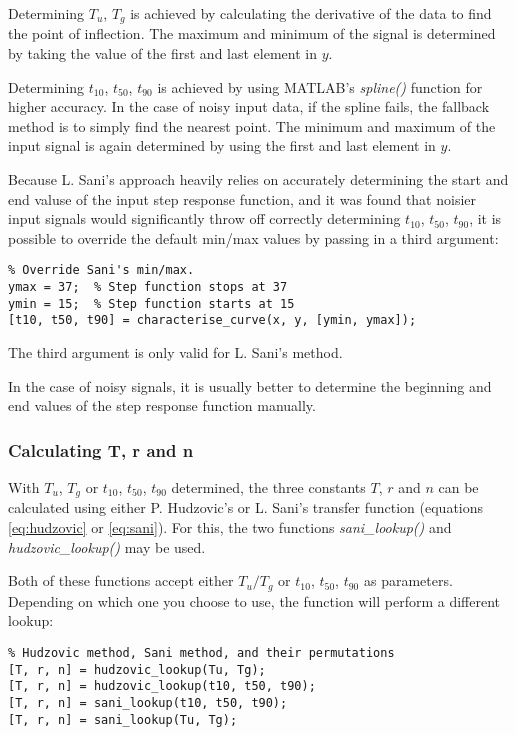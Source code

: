 Determining $T_u$, $T_g$ is achieved by calculating  the  derivative of the data
to  find  the  point  of  inflection.  The maximum and minimum of the signal  is
determined  by  taking  the  value  of  the  first  and  last  element  in  $y$.

Determining  $t_{10}$,  $t_{50}$,  $t_{90}$  is  achieved   by   using  MATLAB's
\textit{spline()} function for higher accuracy. In the case of noisy input data,
if  the  spline fails, the fallback method is to simply find the nearest  point.
The minimum and maximum of the input signal  is  again  determined  by using the
first and last element in $y$.

Because L. Sani's approach heavily relies  on  accurately  determining the start
and  end  valuse  of  the input step response function, and it  was  found  that
noisier input  signals  would  significantly  throw  off  correctly  determining
$t_{10}$,  $t_{50}$,  $t_{90}$, it is possible to override the  default  min/max
values by passing in a third argument:

\begin{lstlisting}
% Override Sani's min/max.
ymax = 37;  % Step function stops at 37
ymin = 15;  % Step function starts at 15
[t10, t50, t90] = characterise_curve(x, y, [ymin, ymax]);
\end{lstlisting}

The third argument is only valid for L. Sani's method.

In the case  of  noisy  signals, it is usually better to determine the beginning
and end values of the step response function manually.


\subsubsection*{Calculating T, r and n}

With  $T_u$,  $T_g$  or  $t_{10}$,  $t_{50}$,  $t_{90}$  determined,  the  three
constants $T$, $r$ and $n$ can be calculated using  either  P.  Hudzovic's or L.
Sani's  transfer function (equations \ref{eq:hudzovic}  or  \ref{eq:sani}).  For
this, the two functions  \textit{sani\_lookup()} and \textit{hudzovic\_lookup()}
may be used.

Both  of these functions accept either $T_u/T_g$ or $t_{10}$, $t_{50}$, $t_{90}$
as parameters. Depending  on  which  one  you  choose  to use, the function will
perform a different lookup:

\begin{lstlisting}
% Hudzovic method, Sani method, and their permutations
[T, r, n] = hudzovic_lookup(Tu, Tg);
[T, r, n] = hudzovic_lookup(t10, t50, t90);
[T, r, n] = sani_lookup(t10, t50, t90);
[T, r, n] = sani_lookup(Tu, Tg);
\end{lstlisting}


